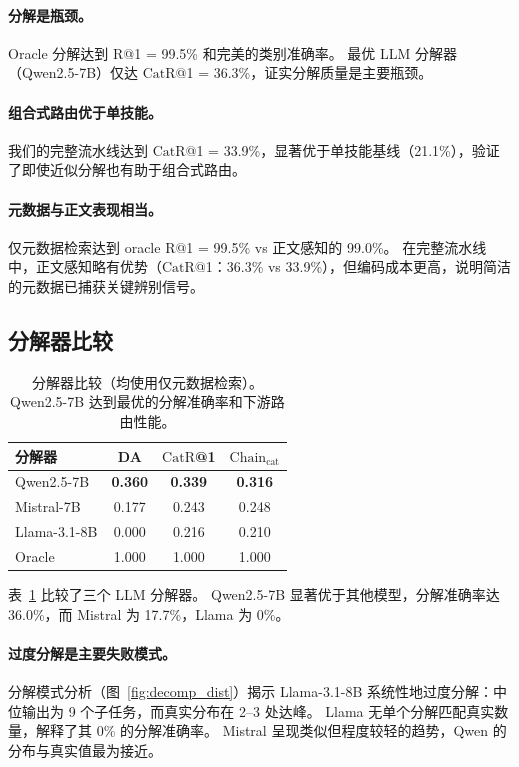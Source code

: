 \documentclass[11pt,a4paper]{ctexart}
\newcommand{\catrecall}{\text{CatR}}
\newcommand{\chaincat}{\text{Chain}_\text{cat}}
\begin{document}
\paragraph{分解是瓶颈。}
Oracle 分解达到 R@1 = 99.5\% 和完美的类别准确率。
最优 LLM 分解器（Qwen2.5-7B）仅达 $\catrecall$@1 = 36.3\%，证实分解质量是主要瓶颈。

\paragraph{组合式路由优于单技能。}
我们的完整流水线达到 $\catrecall$@1 = 33.9\%，显著优于单技能基线（21.1\%），验证了即使近似分解也有助于组合式路由。

\paragraph{元数据与正文表现相当。}
仅元数据检索达到 oracle R@1 = 99.5\% vs 正文感知的 99.0\%。
在完整流水线中，正文感知略有优势（$\catrecall$@1：36.3\% vs 33.9\%），但编码成本更高，说明简洁的元数据已捕获关键辨别信号。

\subsection{分解器比较}

\begin{table}[t]
\centering
\small
\begin{tabular}{lccc}
\toprule
\textbf{分解器} & \textbf{DA} & $\catrecall$\textbf{@1} & $\chaincat$ \\
\midrule
Qwen2.5-7B & \textbf{0.360} & \textbf{0.339} & \textbf{0.316} \\
Mistral-7B & 0.177 & 0.243 & 0.248 \\
Llama-3.1-8B & 0.000 & 0.216 & 0.210 \\
\midrule
Oracle & 1.000 & 1.000 & 1.000 \\
\bottomrule
\end{tabular}
\caption{分解器比较（均使用仅元数据检索）。Qwen2.5-7B 达到最优的分解准确率和下游路由性能。}
\label{tab:decomposer}
\end{table}

表~\ref{tab:decomposer} 比较了三个 LLM 分解器。
Qwen2.5-7B 显著优于其他模型，分解准确率达 36.0\%，而 Mistral 为 17.7\%，Llama 为 0\%。

\paragraph{过度分解是主要失败模式。}
分解模式分析（图~\ref{fig:decomp_dist}）揭示 Llama-3.1-8B 系统性地过度分解：中位输出为 9 个子任务，而真实分布在 2--3 处达峰。
Llama 无单个分解匹配真实数量，解释了其 0\% 的分解准确率。
Mistral 呈现类似但程度较轻的趋势，Qwen 的分布与真实值最为接近。
\end{document}
